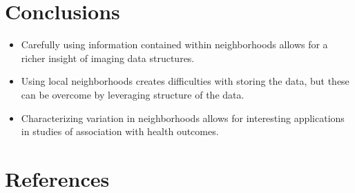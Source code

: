 \documentclass[a0,landscape]{a0poster}
\begin{document}
\begin{multicols}{3}
\large{\section*{\color{uwred}Conclusions}}
\begin{itemize}
\item  Carefully using information contained within neighborhoods allows for a richer insight of imaging data structures.
\item Using local neighborhoods creates difficulties with storing the data, but these can be overcome by leveraging structure of the data.
\item Characterizing variation in neighborhoods allows for interesting applications in studies of association with health outcomes. 
\end{itemize}

\small{\section*{\color{uwred}References}}


\nocite{*} %



\end{multicols}
\end{document}
